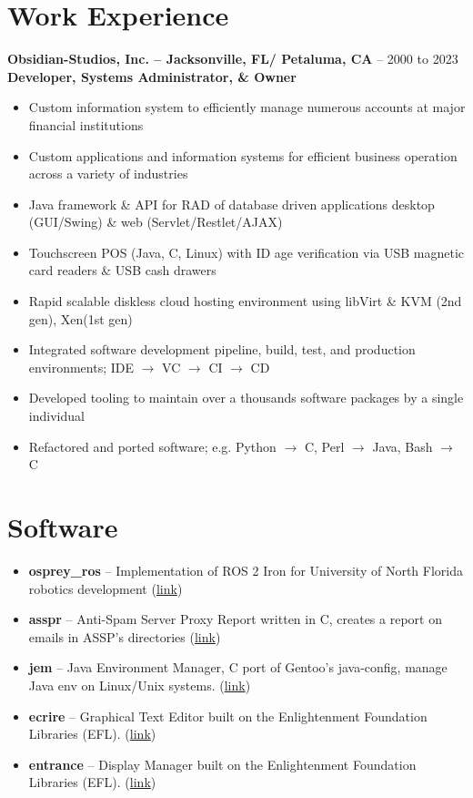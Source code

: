 \documentclass[10pt]{report}
\begin{document}
\section*{Work Experience}
\textbf{Obsidian-Studios, Inc. – Jacksonville, FL/ Petaluma, CA} – 2000 to 2023\newline
\textbf{Developer, Systems Administrator, \& Owner}
\begin{itemize}
  \item Custom information system to efficiently manage numerous accounts at major financial institutions
  \item Custom applications and information systems for efficient business operation across a variety of industries
  \item Java framework \& API for RAD of database driven applications desktop (GUI/Swing) \& web (Servlet/Restlet/AJAX)
  \item Touchscreen POS (Java, C, Linux) with ID age verification via USB magnetic card readers \& USB cash drawers
  \item Rapid scalable diskless cloud hosting environment using libVirt \& KVM (2nd gen), Xen(1st gen)

  \item Integrated software development pipeline, build, test, and production environments; IDE $\rightarrow$ VC $\rightarrow$ CI $\rightarrow$ CD
  \item Developed tooling to maintain over a thousands software packages by a single individual
  \item Refactored and ported software; e.g. Python $\rightarrow$ C, Perl $\rightarrow$ Java, Bash $\rightarrow$ C
\end{itemize}

\section*{Software}
\begin{itemize}
  \item \textbf{osprey\_ros} – Implementation of ROS 2 Iron for University of North Florida robotics development (\href{https://github.com/Osprey-Robotics/osprey_ros}{link})
  \item \textbf{asspr} – Anti-Spam Server Proxy Report written in C, creates a report on emails in ASSP's directories (\href{https://github.com/Obsidian-StudiosInc/asspr}{link})
  \item \textbf{jem} – Java Environment Manager, C port of Gentoo's java-config, manage Java env on Linux/Unix systems. (\href{https://github.com/Obsidian-StudiosInc/jem}{link})
  \item \textbf{ecrire} – Graphical Text Editor built on the Enlightenment Foundation Libraries (EFL). (\href{https://github.com/Obsidian-StudiosInc/ecrire}{link})
  \item \textbf{entrance} – Display Manager built on the Enlightenment Foundation Libraries (EFL). (\href{https://github.com/Obsidian-StudiosInc/entrance}{link})
\end{itemize}
\end{document}
